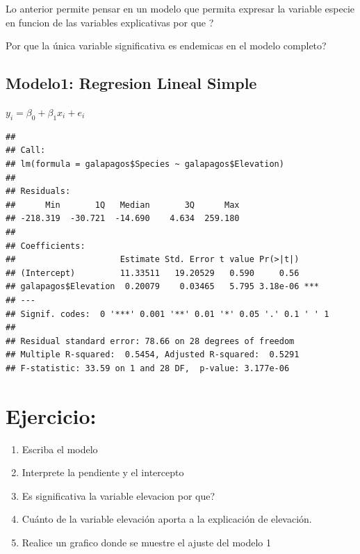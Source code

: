 \documentclass[
]{book}
\newenvironment{Shaded}{\begin{snugshade}}{\end{snugshade}}
\newcommand{\KeywordTok}[1]{\textcolor[rgb]{0.13,0.29,0.53}{\textbf{#1}}}
\newcommand{\NormalTok}[1]{#1}
\newcommand{\OperatorTok}[1]{\textcolor[rgb]{0.81,0.36,0.00}{\textbf{#1}}}
\providecommand{\tightlist}{%
  \setlength{\itemsep}{0pt}\setlength{\parskip}{0pt}}
\begin{document}
Lo anterior permite pensar en un modelo que permita expresar la variable especie en funcion de las variables explicativas por que ?

Por que la única variable significativa es endemicas en el modelo completo?

\hypertarget{modelo1-regresion-lineal-simple}{%
\subsection{Modelo1: Regresion Lineal Simple}\label{modelo1-regresion-lineal-simple}}

\(y_i=\beta_{0}+\beta_{1}x_{i}+e_{i}\)

\begin{Shaded}
\end{Shaded}

\begin{verbatim}
## 
## Call:
## lm(formula = galapagos$Species ~ galapagos$Elevation)
## 
## Residuals:
##      Min       1Q   Median       3Q      Max 
## -218.319  -30.721  -14.690    4.634  259.180 
## 
## Coefficients:
##                     Estimate Std. Error t value Pr(>|t|)    
## (Intercept)         11.33511   19.20529   0.590     0.56    
## galapagos$Elevation  0.20079    0.03465   5.795 3.18e-06 ***
## ---
## Signif. codes:  0 '***' 0.001 '**' 0.01 '*' 0.05 '.' 0.1 ' ' 1
## 
## Residual standard error: 78.66 on 28 degrees of freedom
## Multiple R-squared:  0.5454,	Adjusted R-squared:  0.5291 
## F-statistic: 33.59 on 1 and 28 DF,  p-value: 3.177e-06
\end{verbatim}

\hypertarget{ejercicio}{%
\section{Ejercicio:}\label{ejercicio}}

\begin{enumerate}
\def\labelenumi{\alph{enumi}.}
\tightlist
\item
  Escriba el modelo\\
\item
  Interprete la pendiente y el intercepto\\
\item
  Es significativa la variable elevacion por que?\\
\item
  Cuánto de la variable elevación aporta a la explicación de elevación.\\
\item
  Realice un grafico donde se muestre el ajuste del modelo 1
\end{enumerate}
\end{document}
